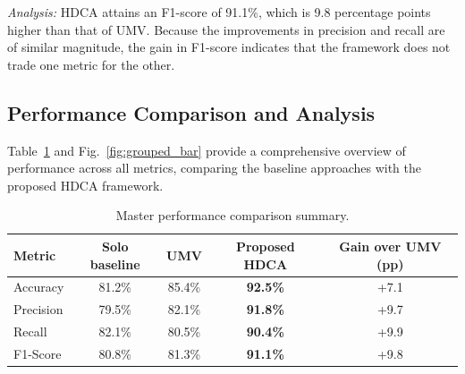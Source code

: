 \documentclass[a4paper,fleqn]{cas-sc}
\begin{document}
\textit{Analysis:} HDCA attains an F1-score of 91.1\%, which is 9.8 percentage points higher than that of UMV. Because the improvements in precision and recall are of similar magnitude, the gain in F1-score indicates that the framework does not trade one metric for the other.

\subsection{Performance Comparison and Analysis}
Table~\ref{tab:master_summary} and Fig.~\ref{fig:grouped_bar} provide a comprehensive overview of performance across all metrics, comparing the baseline approaches with the proposed HDCA framework.

\begin{table}[pos=H]
\caption{Master performance comparison summary.}
\label{tab:master_summary}
\centering
\begin{tabular}{lcccc}
\hline
\textbf{Metric} & \textbf{Solo baseline} & \textbf{UMV} & \textbf{Proposed HDCA} & \textbf{Gain over UMV (pp)} \\
\hline
Accuracy  & 81.2\% & 85.4\% & \textbf{92.5\%} & +7.1 \\
Precision & 79.5\% & 82.1\% & \textbf{91.8\%} & +9.7 \\
Recall    & 82.1\% & 80.5\% & \textbf{90.4\%} & +9.9 \\
F1-Score  & 80.8\% & 81.3\% & \textbf{91.1\%} & +9.8 \\
\hline
\end{tabular}
\end{table}
\end{document}
